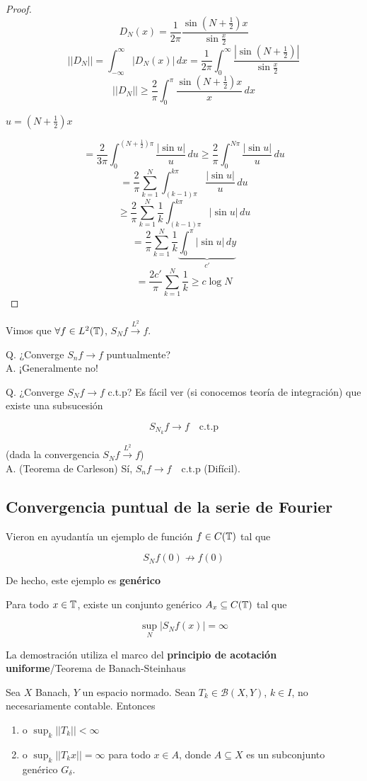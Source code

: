 \begin{proof}
    \[D_N(x)=\frac{1}{2\pi}\frac{\sin(N+\frac{1}{2})x}{\sin \frac{x}{2}}\]
    \[||D_N||=\int_{-\infty}^\infty |D_N(x)|\,dx=\frac{1}{2\pi}\int_0^\infty \frac{|\sin(N+\frac{1}{2})|}{\sin \frac{x}{2}}\]
    \[||D_N||\geq \frac{2}{\pi}\int_0^\pi \frac{\sin(N+\frac{1}{2})x}{x}\,dx\]

    $u=(N+\frac{1}{2})x$

    \[=\frac{2}{3\pi}\int_0^{(N+\frac{1}{2})\pi} \frac{|\sin u|}{u}\,du\geq \frac{2}{\pi}\int_0^{N\pi}\frac{|\sin u|}{u}\,du\]
    \[=\frac{2}{\pi}\sum_{k=1}^N \int_{(k-1)\pi}^{k\pi} \frac{|\sin u|}{u}\,du\]
    \[\geq \frac{2}{\pi}\sum_{k=1}^N \frac{1}{k}\int_{(k-1)\pi}^{k\pi} |\sin u|\,du\]
    \[=\frac{2}{\pi}\sum_{k=1}^N \frac{1}{k}\underbrace{\int_0^\pi |\sin u|\,dy}_{c'}\]
    \[=\frac{2c'}{\pi}\sum_{k=1}^N \frac{1}{k}\geq c\log N\]
\end{proof}

Vimos que $\forall f\in L^2(\mathbb{T})$, $S_Nf\xrightarrow{L^2}f$. 

Q. ¿Converge $S_nf\to f$ puntualmente?\\
A. ¡Generalmente no!

Q. ¿Converge $S_N f\to f$ c.t.p? Es fácil ver (si conocemos teoría de integración) que existe una subsucesión 

\[S_{N_k}f\to f\quad \text{c.t.p}\]

(dada la convergencia $S_N f\xrightarrow{L^2}f$)\\
A. (Teorema de Carleson) Sí, $S_nf\to f\quad \text{c.t.p}$ (Difícil).

\subsection{Convergencia puntual de la serie de Fourier}

Vieron en ayudantía un ejemplo de función $f\in C(\mathbb{T})$ tal que 

\[S_N f(0)\not\to f(0)\]

De hecho, este ejemplo es \textbf{genérico}

\begin{ftheorem}
    Para todo $x\in \mathbb{T}$, existe un conjunto genérico $A_x\subseteq C(\mathbb{T})$ tal que 

    \[\sup_N |S_N f(x)|=\infty\]
\end{ftheorem}

La demostración utiliza el marco del \textbf{principio de acotación uniforme}/Teorema de Banach-Steinhaus

\begin{ftheorem}
    Sea $X$ Banach, $Y$ un espacio normado. Sean $T_k\in \mathcal{B}(X,Y)$, $k\in I$, no necesariamente contable. Entonces 

    \begin{enumerate}
        \item o $\sup_k ||T_k||<\infty$
        \item o $\sup_k ||T_k x||=\infty$ para todo $x\in A$, donde $A\subseteq X$ es un subconjunto genérico $G_\delta$.
    \end{enumerate}

\end{ftheorem}

